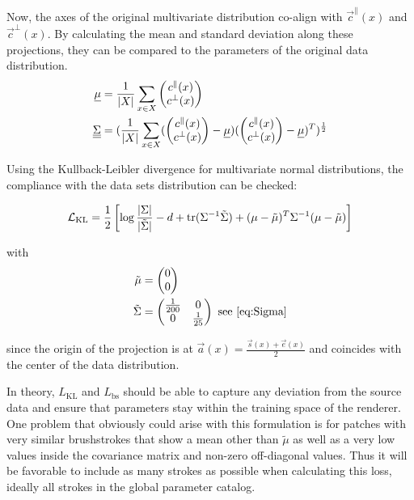 Now, the axes of the original multivariate distribution co-align with $\vec{c}^\parallel(x)$ and $\vec{c}^\bot(x)$.
By calculating the mean and standard deviation along these projections, they can be compared to the parameters of the original data distribution.
\begin{align}
    \underline\mu & = \frac{1}{\vert X \vert}\sum_{x \in X} \begin{pmatrix} c^\parallel(x) \\ c^\bot(x) \end{pmatrix} \\
    \underline{\underline{\Sigma}} & = (\frac{1}{\vert X \vert} \sum_{x \in X}
        (\begin{pmatrix} c^\parallel(x) \\ c^\bot(x) \end{pmatrix} - \underline\mu)
        (\begin{pmatrix} c^\parallel(x) \\ c^\bot(x) \end{pmatrix} - \underline\mu)^T
        )^{\frac{1}{2}} \\
\end{align}

Using the Kullback-Leibler divergence for multivariate normal distributions, the compliance with the data sets distribution can be checked:

\begin{align}
    \mathcal{L}_{\text{KL}} = \frac{1}{2}\left[\log\frac{|\Sigma|}{|\tilde{\Sigma}|} - d + \text{tr} ( \Sigma^{-1}\tilde{\Sigma} ) + (\mu - \tilde{\mu})^T \Sigma^{-1}(\mu - \tilde{\mu})\right]
\end{align}

with 
\begin{align}
    \tilde{\mu} & = \begin{pmatrix} 0 \\ 0 \end{pmatrix} \\
    \tilde{\Sigma} & = \begin{pmatrix} \frac{1}{200} & 0 \\ 0 & \frac{1}{25} \end{pmatrix} \text{ see \eqref{eq:Sigma}}
\end{align}

since the origin of the projection is at $\vec{a}(x) = \frac{\vec{s}(x) + \vec{e}(x)}{2}$ and coincides with the center of the data distribution.

In theory, $L_{\text{KL}}$ and $L_{\text{bs}}$ should be able to capture any deviation from the source data and ensure that parameters stay within the training space of the renderer.
One problem that obviously could arise with this formulation is for patches with very similar brushstrokes that show a mean other than $\tilde{\mu}$ as well as a very low values inside the covariance matrix and non-zero off-diagonal values.
Thus it will be favorable to include as many strokes as possible when calculating this loss, ideally all strokes in the global parameter catalog.

